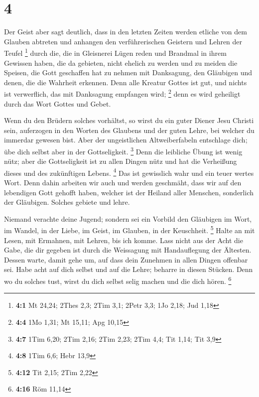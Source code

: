 \hypertarget{section-3}{%
\section{4}\label{section-3}}

 Der Geist aber sagt deutlich, dass in den letzten Zeiten
werden etliche von dem Glauben abtreten und anhangen den verführerischen
Geistern und Lehren der Teufel \footnote{\textbf{4:1} Mt 24,24; 2Thes
  2,3; 2Tim 3,1; 2Petr 3,3; 1Jo 2,18; Jud 1,18}  durch die,
die in Gleisnerei Lügen reden und Brandmal in ihrem Gewissen haben,
 die da gebieten, nicht ehelich zu werden und zu meiden die
Speisen, die Gott geschaffen hat zu nehmen mit Danksagung, den Gläubigen
und denen, die die Wahrheit erkennen.  Denn alle Kreatur
Gottes ist gut, und nichts ist verwerflich, das mit Danksagung empfangen
wird; \footnote{\textbf{4:4} 1Mo 1,31; Mt 15,11; Apg 10,15} 
denn es wird geheiligt durch das Wort Gottes und Gebet.

 Wenn du den Brüdern solches vorhältst, so wirst du ein
guter Diener Jesu Christi sein, auferzogen in den Worten des Glaubens
und der guten Lehre, bei welcher du immerdar gewesen bist. 
Aber der ungeistlichen Altweiberfabeln entschlage dich; übe dich selbst
aber in der Gottseligkeit. \footnote{\textbf{4:7} 1Tim 6,20; 2Tim 2,16;
  2Tim 2,23; 2Tim 4,4; Tit 1,14; Tit 3,9}  Denn die
leibliche Übung ist wenig nütz; aber die Gottseligkeit ist zu allen
Dingen nütz und hat die Verheißung dieses und des zukünftigen Lebens.
\footnote{\textbf{4:8} 1Tim 6,6; Hebr 13,9}  Das ist
gewisslich wahr und ein teuer wertes Wort.  Denn dahin
arbeiten wir auch und werden geschmäht, dass wir auf den lebendigen Gott
gehofft haben, welcher ist der Heiland aller Menschen, sonderlich der
Gläubigen.  Solches gebiete und lehre.

 Niemand verachte deine Jugend; sondern sei ein Vorbild den
Gläubigen im Wort, im Wandel, in der Liebe, im Geist, im Glauben, in der
Keuschheit. \footnote{\textbf{4:12} Tit 2,15; 2Tim 2,22} 
Halte an mit Lesen, mit Ermahnen, mit Lehren, bis ich komme.
 Lass nicht aus der Acht die Gabe, die dir gegeben ist
durch die Weissagung mit Handauflegung der Ältesten. 
Dessen warte, damit gehe um, auf dass dein Zunehmen in allen Dingen
offenbar sei.  Habe acht auf dich selbst und auf die Lehre;
beharre in diesen Stücken. Denn wo du solches tust, wirst du dich selbst
selig machen und die dich hören. \footnote{\textbf{4:16} Röm 11,14}

